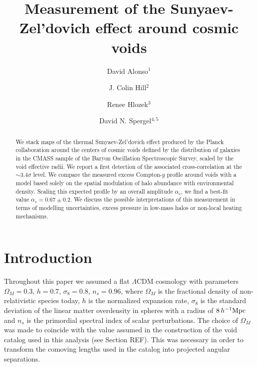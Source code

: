 \documentclass[twocolumn,amsfont,amssymb,amsmath, showpacs,balancelastpage, nofootinbib]{revtex4-1}
\newcommand{\DAM}[1]{{\color{red}{\bf DA: #1}}}
\begin{document}
  \title{Measurement of the Sunyaev-Zel'dovich effect around cosmic voids}
  \author{David Alonso$^1$}
  \author{J. Colin Hill$^2$}
  \author{Renee Hlozek$^3$}
  \author{David N. Spergel$^{4,5}$}

  \begin{abstract}
    We stack maps of the thermal Sunyaev-Zel'dovich effect produced by the Planck collaboration
    around the centers of cosmic voids defined by the distribution of galaxies in the CMASS sample
    of the Baryon Oscillation Spectroscopic Survey, scaled by the void effective radii. We report
    a first detection of the associated cross-correlation at the $\sim3.4\sigma$ level. We compare
    the measured excess Compton-$y$ profile around voids with a model based solely on the spatial
    modulation of halo abundance with environmental density. Scaling this expected profile by an
    overall amplitude $\alpha_v$, we find a best-fit value $\alpha_v=0.67\pm0.2$. We discuss
    the possible interpretations of this measurement in terms of modelling uncertainties, excess
    pressure in low-mass halos or non-local heating mechanisms.
  \end{abstract}

  \maketitle

  \section{Introduction}\label{sec:intro}
    \DAM{Introduction: how cool and useful voids are. What the SZ effect is and
         current cool things that have been done with it. The interest
         of measuring the temperature of different environments...}
    
    Throughout this paper we assumed a flat $\Lambda$CDM cosmology with parameters $\Omega_M=0.3$,
    $h=0.7$, $\sigma_8=0.8$, $n_s=0.96$, where $\Omega_M$ is the fractional density of
    non-relativistic species today, $h$ is the normalized expansion rate, $\sigma_8$ is the
    standard deviation of the linear matter overdensity in spheres with a radius of
    $8\,h^{-1}{\rm Mpc}$ and $n_s$ is the primordial spectral index of scalar perturbations. The
    choice of $\Omega_M$ was made to coincide with the value assumed in the construction of the
    void catalog used in this analysis (see Section REF). This was necessary in order to transform
    the comoving lengths used in the catalog into projected angular separations.
    
\end{document}
